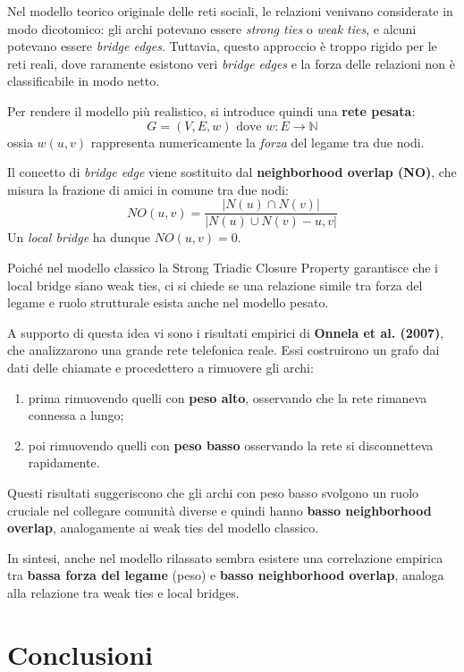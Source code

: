 Nel modello teorico originale delle reti sociali, le relazioni venivano considerate in modo dicotomico: gli archi potevano essere \textit{strong ties} o \textit{weak ties}, e alcuni potevano essere \textit{bridge edges}. Tuttavia, questo approccio è troppo rigido per le reti reali, dove raramente esistono veri \textit{bridge edges} e la forza delle relazioni non è classificabile in modo netto.

Per rendere il modello più realistico, si introduce quindi una \textbf{rete pesata}:
\[
G = (V, E, w) \text{ dove } w : E \rightarrow \mathbb{N}
\]
ossia $w(u,v)$ rappresenta numericamente la \textit{forza} del legame tra due nodi.

Il concetto di \textit{bridge edge} viene sostituito dal \textbf{neighborhood overlap (NO)}, che misura la frazione di amici in comune tra due nodi:
\[
NO(u,v) = \frac{|N(u) \cap N(v)|}{|N(u) \cup N(v) - {u,v}|}
\]
Un \textit{local bridge} ha dunque $NO(u,v) = 0$.

Poiché nel modello classico la Strong Triadic Closure Property garantisce che i local bridge siano weak ties, ci si chiede se una relazione simile tra forza del legame e ruolo strutturale esista anche nel modello pesato.

A supporto di questa idea vi sono i risultati empirici di \textbf{Onnela et al. (2007)}, che analizzarono una grande rete telefonica reale. Essi costruirono un grafo dai dati delle chiamate e procedettero a rimuovere gli archi:

\begin{enumerate}
    \item prima rimuovendo quelli con \textbf{peso alto}, osservando che la rete rimaneva connessa a lungo;
    \item poi rimuovendo quelli con \textbf{peso basso} osservando la rete si disconnetteva rapidamente.
\end{enumerate}

Questi risultati suggeriscono che gli archi con peso basso svolgono un ruolo cruciale nel collegare comunità diverse e quindi hanno \textbf{basso neighborhood overlap}, analogamente ai weak ties del modello classico.

In sintesi, anche nel modello rilassato sembra esistere una correlazione empirica tra \textbf{bassa forza del legame} (peso) e \textbf{basso neighborhood overlap}, analoga alla relazione tra weak ties e local bridges.

\section{Conclusioni}

